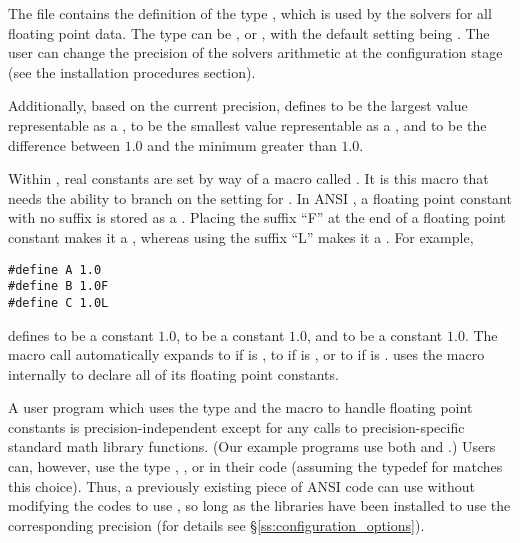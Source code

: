 %
The  file contains the definition of the type ,
which is used by the {\sundials} solvers for all floating point data.
The type  can be ,  or , with
the default setting being .
The user can change the precision of the {\sundials} solvers arithmetic at the
configuration stage (see the {\sundials} installation procedures section).

Additionally, based on the current precision,  defines 
 to be the largest value representable as a ,
 to be the smallest value representable as a , and
 to be the difference between $1.0$ and the minimum 
greater than $1.0$.

Within {\sundials}, real constants are set by way of a macro called
.  It is this macro that needs the ability to branch on the
setting for .  In ANSI {\C}, a floating point constant with no
suffix is stored as a .  Placing the suffix ``F'' at the
end of a floating point constant makes it a , whereas using the suffix
``L'' makes it a .  For example,
\begin{verbatim}
#define A 1.0
#define B 1.0F
#define C 1.0L
\end{verbatim}
defines  to be a  constant $1.0$,  to be a
 constant $1.0$, and  to be a  constant
$1.0$.  The macro call  automatically expands to 
if  is , to  if  is ,
or to  if  is .  {\sundials} uses the
 macro internally to declare all of its floating point constants. 

A user program which uses the type  and the  macro
to handle floating point constants is precision-independent except for
any calls to precision-specific standard math library
functions.  (Our example programs use both  and
.)  Users can, however, use the type , , or
 in their code (assuming the typedef for  matches
this choice).  Thus, a previously existing piece of ANSI {\C} code can use
{\sundials} without modifying the codes to use , so long
as the {\sundials} libraries have been installed to use the
corresponding precision (for details see \S\ref{ss:configuration_options}).
